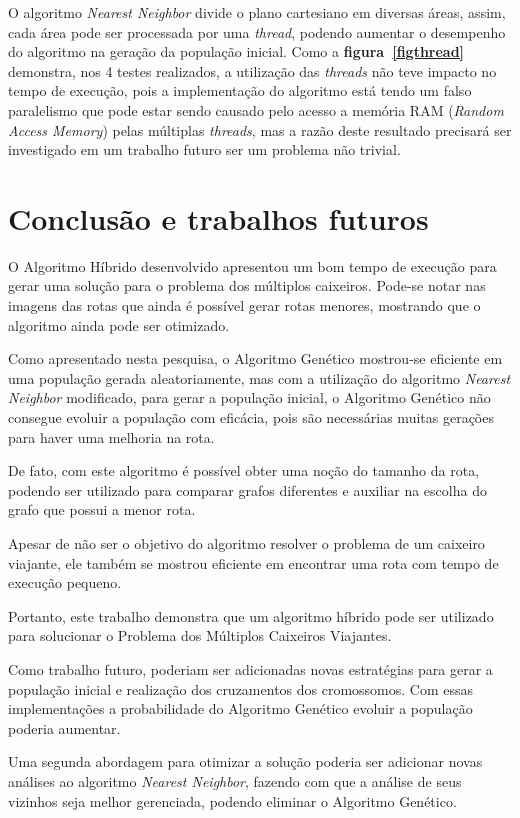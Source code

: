 \documentclass[12pt,openright,a4paper,oneside]{tcc}
\begin{document}
            O algoritmo \textit{Nearest Neighbor} divide o plano cartesiano em diversas áreas, assim, cada área pode ser processada por uma \textit{thread}, podendo aumentar o desempenho do algoritmo na geração da população inicial. Como a \textbf{figura~\ref{figthread}} demonstra, nos 4 testes realizados, a utilização das \textit{threads} não teve impacto no tempo de execução, pois a implementação do algoritmo está tendo um falso paralelismo que pode estar sendo causado pelo acesso a memória RAM (\textit{Random Access Memory}) pelas múltiplas \textit{threads}, mas a razão deste resultado precisará ser investigado em um trabalho futuro ser um problema não trivial.  


	\chapter{Conclusão e trabalhos futuros}
		
	O Algoritmo Híbrido desenvolvido apresentou um bom tempo de execução para gerar uma solução para o problema dos múltiplos caixeiros. Pode-se notar nas imagens das rotas que ainda é possível gerar rotas menores, mostrando que o algoritmo ainda pode ser otimizado.

    Como apresentado nesta pesquisa, o Algoritmo Genético mostrou-se eficiente em uma população gerada aleatoriamente, mas com a utilização do algoritmo \textit{Nearest Neighbor} modificado, para gerar a população inicial, o Algoritmo Genético não consegue evoluir a população com eficácia, pois são necessárias muitas gerações para haver uma melhoria na rota.

    De fato, com este algoritmo é possível obter uma noção do tamanho da rota, podendo ser utilizado para comparar grafos diferentes e auxiliar na escolha do grafo que possui a menor rota.

    Apesar de não ser o objetivo do algoritmo resolver o problema de um caixeiro viajante, ele também se mostrou eficiente em encontrar uma rota com tempo de execução pequeno.

    Portanto, este trabalho demonstra que um algoritmo híbrido pode ser utilizado para solucionar o Problema dos Múltiplos Caixeiros Viajantes.  

    Como trabalho futuro, poderiam ser adicionadas novas estratégias para gerar a população inicial e realização dos cruzamentos dos cromossomos. Com essas implementações a probabilidade do Algoritmo Genético evoluir a população poderia aumentar.

    Uma segunda abordagem para otimizar a solução poderia ser adicionar novas análises ao algoritmo \textit{Nearest Neighbor}, fazendo com que a análise de seus vizinhos seja melhor gerenciada, podendo eliminar o Algoritmo Genético.
\end{document}
